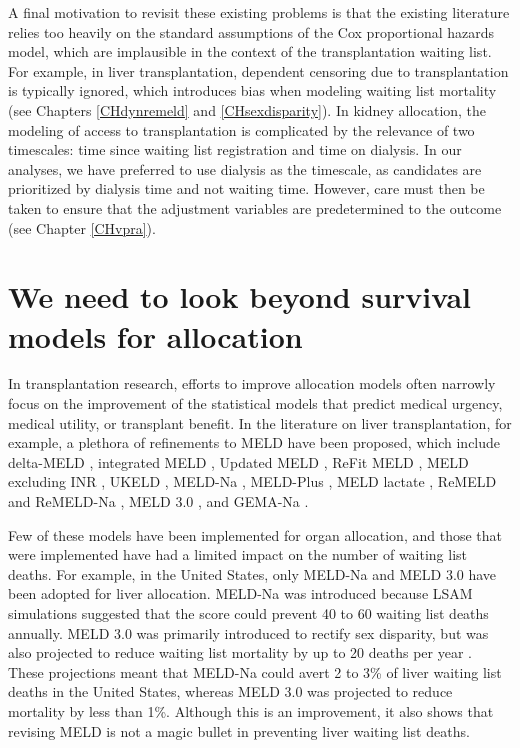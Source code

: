 \documentclass[11pt,twoside,]{book}
\begin{document}
A final motivation to revisit these existing problems is that the existing literature
relies too heavily on the standard assumptions of the Cox proportional hazards model,
which are implausible in the context of the transplantation waiting list. For example, in
liver transplantation, dependent censoring due to transplantation is typically
ignored, which introduces bias when modeling waiting list mortality
(see Chapters \ref{CHdynremeld} and \ref{CHsexdisparity}). In kidney
allocation, the modeling of access to transplantation is complicated by the relevance
of two timescales: time since waiting list registration and time on dialysis.
In our analyses, we have preferred to use dialysis as the timescale, as candidates
are prioritized by dialysis time and not waiting time. However, care must then
be taken to ensure that the adjustment variables are predetermined to the outcome (see Chapter \ref{CHvpra}).

\vfill

\section{We need to look beyond survival models for allocation}\label{we-need-to-look-beyond-survival-models-for-allocation}

In transplantation research, efforts to improve allocation models often narrowly
focus on the improvement of the statistical models that predict medical urgency,
medical utility, or transplant benefit. In the literature on liver transplantation,
for example, a plethora of refinements to MELD have been proposed, which
include delta-MELD \citep{merionLongitudinalAssessmentMortality2003}, integrated
MELD \citep{Luca2007}, Updated MELD \citep{sharmaReweightingModelEndStage2008},
ReFit MELD \citep{leiseRevisedModelEndstage2011}, MELD excluding INR \citep{Heuman2006},
UKELD \citep{Neuberger2007}, MELD-Na \citep{kimHyponatremiaMortalityPatients2008a},
MELD-Plus \citep{Kartoun2017}, MELD lactate \citep{Sarmast2020}, ReMELD and ReMELD-Na
\citep{goudsmitValidationModelEndstage2020a}, MELD 3.0 \citep{kimMELD3point0},
and GEMA-Na \citep{rodriguezPeralvarezDevelopmentValidationGenderEquity2023}.

Few of these models have been implemented for organ allocation, and
those that were implemented have had a limited impact on the number of waiting list deaths.
For example, in the United States, only MELD-Na and MELD 3.0 have been adopted for
liver allocation. MELD-Na was introduced because LSAM simulations suggested
that the score could prevent 40 to 60 waiting list deaths annually. MELD 3.0 was
primarily introduced to rectify sex disparity, but was also projected to reduce
waiting list mortality by up to 20 deaths per year \citep{kimMELD3point0}. These
projections meant that MELD-Na could avert 2 to 3\% of liver waiting list deaths in the
United States, whereas
MELD 3.0 was projected to reduce mortality by less than 1\%. Although this is an
improvement, it also shows that revising MELD is not a magic bullet in preventing
liver waiting list deaths.
\end{document}
